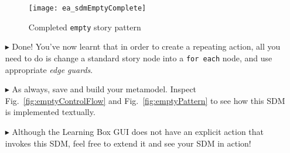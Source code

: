 \begin{itemize}
\begin{figure}[htbp]
\begin{center}
  \texttt{[image: ea\_sdmEmptyComplete]}
  \caption{Completed \texttt{empty} story pattern}  
  \label{fig:sdm_end}
\end{center}
\end{figure}
\FloatBarrier

\item[$\blacktriangleright$] Done! You've now learnt that in order to create a repeating action, all you need to do is change a standard story node
into a \texttt{for each} node, and use appropriate \emph{edge guards}. 

\vspace{0.5cm}

\item[$\blacktriangleright$] As always, save and build your metamodel. Inspect Fig.~\ref{fig:emptyControlFlow} and Fig.~\ref{fig:emptyPattern} to see how this
SDM is implemented textually.

\vspace{0.5cm}

\item[$\blacktriangleright$] Although the Learning Box GUI does not have an explicit action that invokes this SDM, feel free to extend it and see your SDM in
action!

\vspace{0.5cm}


\end{itemize}

